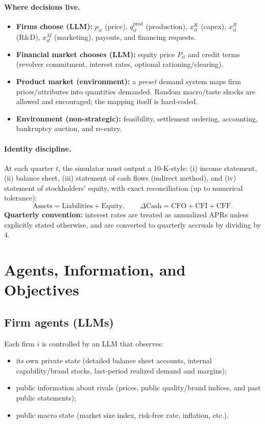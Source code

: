 \documentclass[11pt]{article}
\begin{document}
\paragraph{Where decisions live.}
\begin{itemize}[leftmargin=*]
    \item \textbf{Firms choose (LLM):} $p_{it}$ (price), $q^{\text{prod}}_{it}$ (production), $x^K_{it}$ (capex), $x^R_{it}$ (R\&D), $x^M_{it}$ (marketing), payouts, and financing requests.
    \item \textbf{Financial market chooses (LLM):} equity price $P_{it}$ and credit terms (revolver commitment, interest rates, optional rationing/clearing).
    \item \textbf{Product market (environment):} a \emph{preset} demand system maps firm prices/attributes into quantities demanded. Random macro/taste shocks are allowed and encouraged; the mapping itself is hard-coded.
    \item \textbf{Environment (non-strategic):} feasibility, settlement ordering, accounting, bankruptcy auction, and re-entry.
\end{itemize}

\paragraph{Identity discipline.}
At each quarter $t$, the simulator must output a 10-K-style:
(i) income statement, (ii) balance sheet, (iii) statement of cash flows (indirect method), and (iv) statement of stockholders' equity,
with exact reconciliation (up to numerical tolerance):
\[
\text{Assets}=\text{Liabilities}+\text{Equity},\qquad \Delta \text{Cash}=\text{CFO}+\text{CFI}+\text{CFF}.
\]
\textbf{Quarterly convention:} interest rates are treated as annualized APRs unless explicitly stated otherwise, and are converted to quarterly accruals by dividing by $4$.

\section{Agents, Information, and Objectives}

\subsection{Firm agents (LLMs)}
Each firm $i$ is controlled by an LLM that observes:
\begin{itemize}[leftmargin=*]
    \item its own private state (detailed balance sheet accounts, internal capability/brand stocks, last-period realized demand and margins);
    \item public information about rivals (prices, public quality/brand indices, and past public statements);
    \item public macro state (market size index, risk-free rate, inflation, etc.).
\end{itemize}
\end{document}
